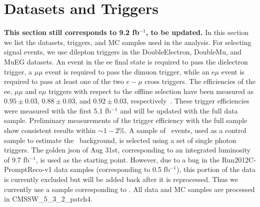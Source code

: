 \clearpage

\section{Datasets and Triggers}
\label{sec:datasets}

{\bf This section still corresponds to 9.2 fb$^{-1}$, to be updated.}
In this section we list the datasets, triggers, and MC samples used in the analysis. For selecting signal
events, we use dilepton triggers in the DoubleElectron, DoubleMu, and MuEG datasets. 
An event in the ee final state is required to pass the dielectron trigger, a 
$\mu\mu$ event is required to pass the dimuon trigger, while an e$\mu$ event is required to pass at least one 
of the two $e-\mu$ cross triggers. The efficiencies of the ee, $\mu\mu$ and e$\mu$ triggers with respect to the
offline selection have been measured as $0.95\pm0.03$, $0.88\pm0.03$, and $0.92\pm0.03$, respectively~\cite{ref:SSAN}.  
These trigger efficiencies were measured with the first 5.1 fb$^{-1}$ and will be updated with the full data sample. 
Preliminary measurements of the trigger efficiency with the full sample show consistent results within $\sim1-2$\%.
A sample of \gjets\ events, used as a control sample to estimate the \zjets\
background, is selected using a set of single photon triggers.
The golden json of Aug 31st, corresponding to an integrated luminosity of 9.7 fb$^{-1}$, is used as the starting point.
However, due to a bug in the Run2012C-PromptReco-v1 data samples (corresponding to 0.5 fb$^{-1}$), this portion of the data
is currently excluded but will be added back after it is reprocessed. Thus we currently use a sample corresponding to \lumi.
All data and MC samples are processed in CMSSW\_5\_3\_2\_patch4.

